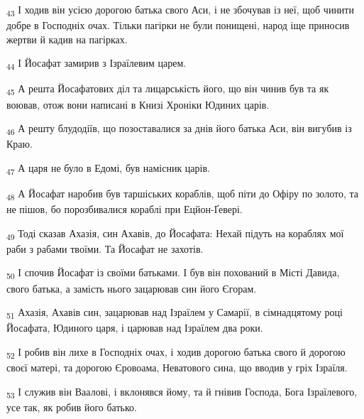 \begin{tcolorbox}
\textsubscript{43} І ходив він усією дорогою батька свого Аси, і не збочував із неї, щоб чинити добре в Господніх очах. Тільки пагірки не були понищені, народ іще приносив жертви й кадив на пагірках.
\end{tcolorbox}
\begin{tcolorbox}
\textsubscript{44} І Йосафат замирив з Ізраїлевим царем.
\end{tcolorbox}
\begin{tcolorbox}
\textsubscript{45} А решта Йосафатових діл та лицарськість його, що він чинив був та як воював, отож вони написані в Книзі Хроніки Юдиних царів.
\end{tcolorbox}
\begin{tcolorbox}
\textsubscript{46} А решту блудодіїв, що позоставалися за днів його батька Аси, він вигубив із Краю.
\end{tcolorbox}
\begin{tcolorbox}
\textsubscript{47} А царя не було в Едомі, був намісник царів.
\end{tcolorbox}
\begin{tcolorbox}
\textsubscript{48} А Йосафат наробив був таршіських кораблів, щоб піти до Офіру по золото, та не пішов, бо порозбивалися кораблі при Ецйон-Ґевері.
\end{tcolorbox}
\begin{tcolorbox}
\textsubscript{49} Тоді сказав Ахазія, син Ахавів, до Йосафата: Нехай підуть на кораблях мої раби з рабами твоїми. Та Йосафат не захотів.
\end{tcolorbox}
\begin{tcolorbox}
\textsubscript{50} І спочив Йосафат із своїми батьками. І був він похований в Місті Давида, свого батька, а замість нього зацарював син його Єгорам.
\end{tcolorbox}
\begin{tcolorbox}
\textsubscript{51} Ахазія, Ахавів син, зацарював над Ізраїлем у Самарії, в сімнадцятому році Йосафата, Юдиного царя, і царював над Ізраїлем два роки.
\end{tcolorbox}
\begin{tcolorbox}
\textsubscript{52} І робив він лихе в Господніх очах, і ходив дорогою батька свого й дорогою своєї матері, та дорогою Єровоама, Неватового сина, що вводив у гріх Ізраїля.
\end{tcolorbox}
\begin{tcolorbox}
\textsubscript{53} І служив він Ваалові, і вклонявся йому, та й гнівив Господа, Бога Ізраїлевого, усе так, як робив його батько.
\end{tcolorbox}
